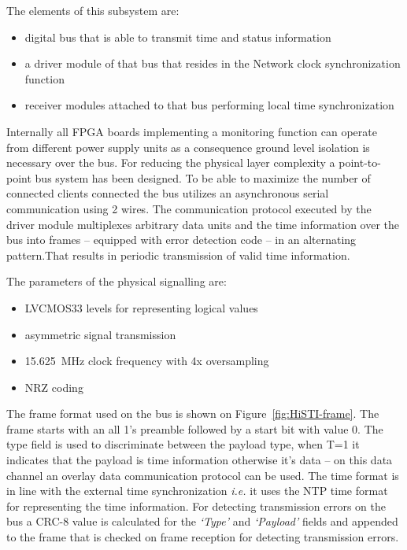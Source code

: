 \documentclass[article]{IEEEtran}
\begin{document}
The elements of this subsystem are:
\begin{itemize}
    \item digital bus that is able to transmit time and status information
    \item a driver module of that bus that resides in the Network clock synchronization function
    \item receiver modules attached to that bus performing local time synchronization
\end{itemize}

Internally all FPGA boards implementing a monitoring function can operate from different power supply units as a
consequence ground level
isolation is necessary over the bus. For reducing the physical layer complexity
a point-to-point bus system has been designed. To be able to maximize the number of connected clients connected the
bus utilizes an asynchronous serial communication using 2 wires. The communication protocol executed by the driver
module
multiplexes arbitrary data units and the time information over the bus into frames -- equipped with error detection
code --
in an alternating pattern.That results in periodic transmission of valid time information.

The parameters of the physical signalling are:
\begin{itemize}
    \item LVCMOS33 levels for representing logical values
    \item asymmetric signal transmission
    \item \SI{15.625}{\mega\hertz} clock frequency with 4x oversampling
    \item NRZ coding
\end{itemize}

The frame format used on the bus is shown on Figure~\ref{fig:HiSTI-frame}. The frame starts with an all 1's preamble
followed by a start bit with value 0. The type field is used to discriminate between the payload type, when T=1 it
indicates that the payload is
time information otherwise it's data -- on this data channel an overlay data communication protocol can be used.
The time format is in line with the external time synchronization \emph{i.e.} it uses the NTP
time format for representing the time information. For detecting transmission errors on the bus a CRC-8 value is
calculated
for the \emph{`Type'} and \emph{`Payload'} fields and appended to the frame that is checked on frame reception for
detecting
transmission errors.
\end{document}

